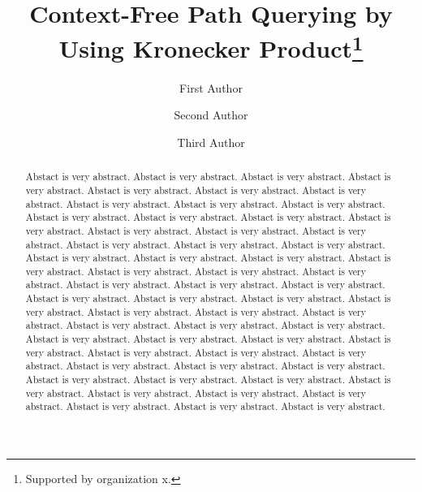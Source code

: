 \documentclass[runningheads]{llncs}
\begin{document}
%
\title{Context-Free Path Querying by Using Kronecker Product\thanks{Supported by organization x.}}
%
%
\author{First Author \and
Second Author \and
Third Author}
%
%
%
\maketitle              %
%
\begin{abstract}
Abstact is very abstract. Abstact is very abstract. Abstact is very abstract. Abstact is very abstract. Abstact is very abstract. Abstact is very abstract.
Abstact is very abstract. Abstact is very abstract. Abstact is very abstract. Abstact is very abstract. Abstact is very abstract. Abstact is very abstract.
Abstact is very abstract. Abstact is very abstract. Abstact is very abstract. Abstact is very abstract. Abstact is very abstract. Abstact is very abstract.
Abstact is very abstract. Abstact is very abstract. Abstact is very abstract. Abstact is very abstract. Abstact is very abstract. Abstact is very abstract.
Abstact is very abstract. Abstact is very abstract. Abstact is very abstract. Abstact is very abstract. Abstact is very abstract. Abstact is very abstract.
Abstact is very abstract. Abstact is very abstract. Abstact is very abstract. Abstact is very abstract. Abstact is very abstract. Abstact is very abstract.
Abstact is very abstract. Abstact is very abstract. Abstact is very abstract. Abstact is very abstract. Abstact is very abstract. Abstact is very abstract.
Abstact is very abstract. Abstact is very abstract. Abstact is very abstract. Abstact is very abstract. Abstact is very abstract. Abstact is very abstract.
Abstact is very abstract. Abstact is very abstract. Abstact is very abstract. Abstact is very abstract. Abstact is very abstract. Abstact is very abstract.
Abstact is very abstract. Abstact is very abstract. Abstact is very abstract. Abstact is very abstract. Abstact is very abstract. Abstact is very abstract.


\end{abstract}
%
%
%
\end{document}
